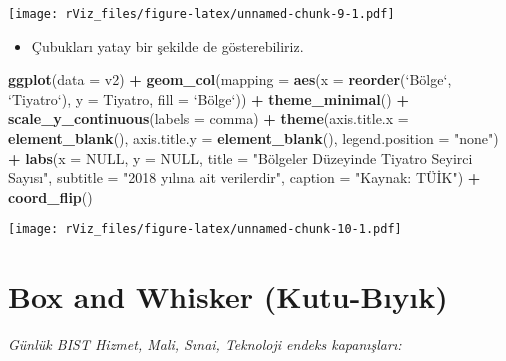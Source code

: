 \documentclass[
]{book}
\newenvironment{Shaded}{\begin{snugshade}}{\end{snugshade}}
\newcommand{\DataTypeTok}[1]{\textcolor[rgb]{0.13,0.29,0.53}{#1}}
\newcommand{\KeywordTok}[1]{\textcolor[rgb]{0.13,0.29,0.53}{\textbf{#1}}}
\newcommand{\NormalTok}[1]{#1}
\newcommand{\OperatorTok}[1]{\textcolor[rgb]{0.81,0.36,0.00}{\textbf{#1}}}
\newcommand{\OtherTok}[1]{\textcolor[rgb]{0.56,0.35,0.01}{#1}}
\newcommand{\StringTok}[1]{\textcolor[rgb]{0.31,0.60,0.02}{#1}}
\providecommand{\tightlist}{%
  \setlength{\itemsep}{0pt}\setlength{\parskip}{0pt}}
\begin{document}
\texttt{[image: rViz\_files/figure-latex/unnamed-chunk-9-1.pdf]}

\begin{itemize}
\tightlist
\item
  Çubukları yatay bir şekilde de gösterebiliriz.
\end{itemize}

\begin{Shaded}
\begin{Highlighting}[]
\KeywordTok{ggplot}\NormalTok{(}\DataTypeTok{data =}\NormalTok{ v2) }\OperatorTok{+}
\StringTok{  }\KeywordTok{geom_col}\NormalTok{(}\DataTypeTok{mapping =} \KeywordTok{aes}\NormalTok{(}\DataTypeTok{x =} \KeywordTok{reorder}\NormalTok{(}\StringTok{`}\DataTypeTok{Bölge}\StringTok{`}\NormalTok{, }\StringTok{`}\DataTypeTok{Tiyatro}\StringTok{`}\NormalTok{), }\DataTypeTok{y =}\NormalTok{ Tiyatro, }\DataTypeTok{fill =} \StringTok{`}\DataTypeTok{Bölge}\StringTok{`}\NormalTok{)) }\OperatorTok{+}
\StringTok{  }\KeywordTok{theme_minimal}\NormalTok{() }\OperatorTok{+}
\StringTok{  }\KeywordTok{scale_y_continuous}\NormalTok{(}\DataTypeTok{labels =}\NormalTok{ comma) }\OperatorTok{+}
\StringTok{  }\KeywordTok{theme}\NormalTok{(}\DataTypeTok{axis.title.x =} \KeywordTok{element_blank}\NormalTok{(),}
        \DataTypeTok{axis.title.y =} \KeywordTok{element_blank}\NormalTok{(),}
        \DataTypeTok{legend.position =} \StringTok{"none"}\NormalTok{) }\OperatorTok{+}
\StringTok{  }\KeywordTok{labs}\NormalTok{(}\DataTypeTok{x =} \OtherTok{NULL}\NormalTok{,}
       \DataTypeTok{y =} \OtherTok{NULL}\NormalTok{,}
       \DataTypeTok{title =} \StringTok{"Bölgeler Düzeyinde Tiyatro Seyirci Sayısı"}\NormalTok{,}
       \DataTypeTok{subtitle =} \StringTok{"2018 yılına ait verilerdir"}\NormalTok{,}
       \DataTypeTok{caption =} \StringTok{"Kaynak: TÜİK"}\NormalTok{) }\OperatorTok{+}
\StringTok{  }\KeywordTok{coord_flip}\NormalTok{()}
\end{Highlighting}
\end{Shaded}

\texttt{[image: rViz\_files/figure-latex/unnamed-chunk-10-1.pdf]}

\hypertarget{box-and-whisker-kutu-bux131yux131k}{%
\section{Box and Whisker (Kutu-Bıyık)}\label{box-and-whisker-kutu-bux131yux131k}}

\emph{Günlük BIST Hizmet, Mali, Sınai, Teknoloji endeks kapanışları:}
\end{document}
